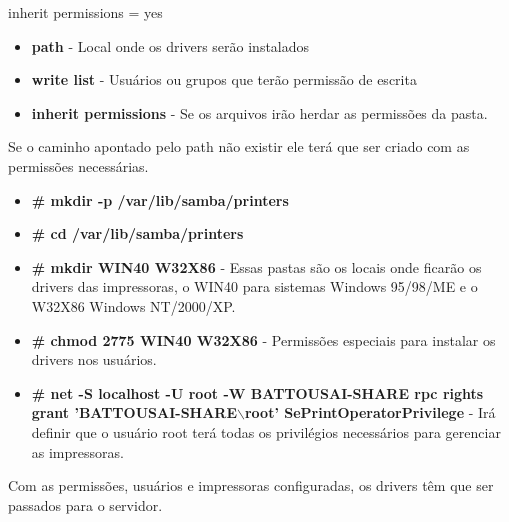 inherit permissions = yes

\begin{itemize}
	\item \textbf{path} - Local onde os drivers serão instalados
	\item \textbf{write list} - Usuários ou grupos que terão permissão de escrita
	\item \textbf{inherit permissions} - Se os arquivos irão herdar as permissões da pasta.
\end{itemize}

Se o caminho apontado pelo path não existir ele terá que ser criado com as permissões necessárias.

\begin{itemize}
	\item \textbf{\# mkdir -p /var/lib/samba/printers}
	
	\item \textbf{\# cd /var/lib/samba/printers}
	\item \textbf{\# mkdir WIN40 W32X86} - Essas pastas são os locais onde ficarão os drivers das impressoras, o WIN40 para sistemas Windows 95/98/ME e o W32X86 Windows NT/2000/XP.
	\item \textbf{\# chmod 2775 WIN40 W32X86} - Permissões especiais para instalar os drivers nos usuários.
	\item \textbf{\# net -S localhost -U root -W BATTOUSAI-SHARE rpc rights grant 'BATTOUSAI-SHARE$\backslash$root' SePrintOperatorPrivilege} - Irá definir que o usuário root terá todas os privilégios necessários para gerenciar as impressoras.
\end{itemize}

Com as permissões, usuários e impressoras configuradas, os drivers têm que ser passados para o servidor.

